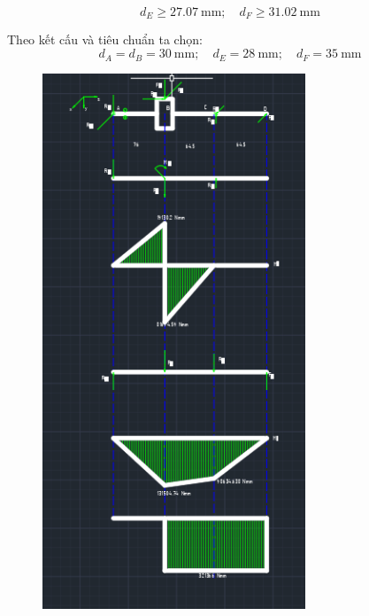 \[
    d_E \ge 27.07\ \text{mm}; \quad d_F \ge 31.02\ \text{mm}
\]

Theo kết cấu và tiêu chuẩn ta chọn:
\[
    d_A = d_B = 30\ \text{mm}; \quad d_E = 28\ \text{mm}; \quad d_F = 35\ \text{mm}
\]
\begin{figure}[H]
    \centering
    \includegraphics[width=0.7\textwidth]{pictures/momen1.png}
\end{figure}

